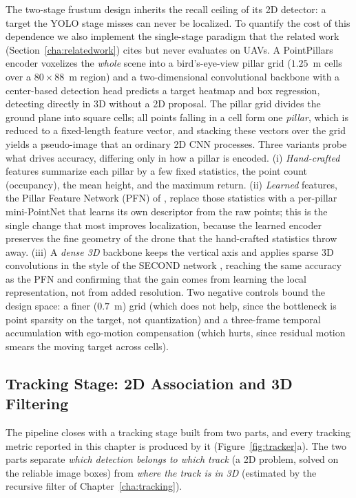 The two-stage frustum design inherits the recall ceiling of its 2D detector: a
target the YOLO stage misses can never be localized. To quantify the cost of this
dependence we also implement the single-stage paradigm that the related work
(Section~\ref{cha:relatedwork}) cites but never evaluates on UAVs. A
PointPillars encoder \cite{lang2019pointpillars} voxelizes the \emph{whole} scene
into a bird's-eye-view pillar grid ($1.25$~m cells over a
$80\times88$~m region) and a two-dimensional convolutional backbone with a
center-based detection head \cite{zhou2019objects} predicts a target heatmap and
box regression, detecting directly in 3D without a 2D proposal. The pillar grid
divides the ground plane into square cells; all points falling in a cell form one
\emph{pillar}, which is reduced to a fixed-length feature vector, and stacking
these vectors over the grid yields a pseudo-image that an ordinary 2D CNN
processes. Three variants probe what drives accuracy, differing only in how a
pillar is encoded. (i) \emph{Hand-crafted} features summarize each pillar by a few
fixed statistics, the point count (occupancy), the mean height, and the maximum
return. (ii) \emph{Learned} features, the Pillar Feature Network (PFN) of
, replace those statistics with a per-pillar
mini-PointNet that learns its own descriptor from the raw points; this is the
single change that most improves localization, because the learned encoder
preserves the fine geometry of the drone that the hand-crafted statistics throw
away. (iii) A \emph{dense 3D} backbone keeps the vertical axis and applies sparse
3D convolutions in the style of the SECOND network , reaching
the same accuracy as the PFN and confirming that the gain comes from learning the
local representation, not from added resolution. Two negative controls bound the
design space: a finer ($0.7$~m) grid (which does not help, since the bottleneck is
point sparsity on the target, not quantization) and a three-frame temporal
accumulation with ego-motion compensation (which hurts, since residual motion
smears the moving target across cells).

\subsection{Tracking Stage: 2D Association and 3D Filtering}
\label{sec:tracker}

The pipeline closes with a tracking stage built from two parts, and every tracking
metric reported in this chapter is produced by it (Figure~\ref{fig:tracker}a).
The two parts separate \emph{which detection belongs to which track} (a 2D problem,
solved on the reliable image boxes) from \emph{where the track is in 3D} (estimated
by the recursive filter of Chapter~\ref{cha:tracking}).

